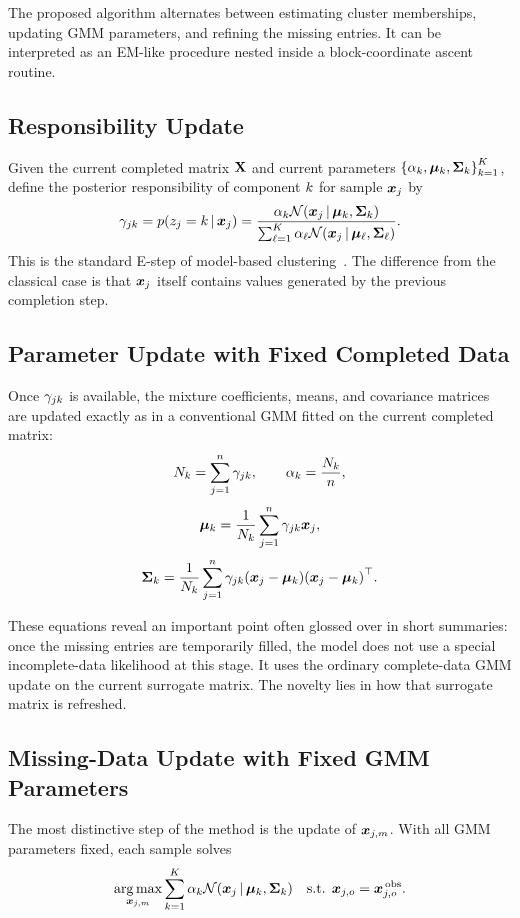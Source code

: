 The proposed algorithm alternates between estimating cluster memberships, updating GMM parameters, and refining the missing entries. It can be interpreted as an EM-like procedure nested inside a block-coordinate ascent routine.

\subsection{Responsibility Update}
Given the current completed matrix $\mat{X}$ and current parameters $\set*{\scal{\alpha}_k,\vect{\mu}_k,\mat{\Sigma}_k}_{k=1}^{\scal{K}}$, define the posterior responsibility of component $\scal{k}$ for sample $\vect{x}_j$ by
\[
    \scal{\gamma}_{jk}
    =
    p\paren*{\scal{z}_j = \scal{k} \given \vect{x}_j}
    =
    \frac{
        \scal{\alpha}_k \N\paren*{\vect{x}_j \given \vect{\mu}_k, \mat{\Sigma}_k}
    }{
        \sum_{\ell=1}^{\scal{K}}
        \scal{\alpha}_{\ell} \N\paren*{\vect{x}_j \given \vect{\mu}_{\ell}, \mat{\Sigma}_{\ell}}
    }.
\]
This is the standard E-step of model-based clustering~\cite{bouman1997cluster,melnykov2010finite}. The difference from the classical case is that $\vect{x}_j$ itself contains values generated by the previous completion step.

\subsection{Parameter Update with Fixed Completed Data}
Once $\scal{\gamma}_{jk}$ is available, the mixture coefficients, means, and covariance matrices are updated exactly as in a conventional GMM fitted on the current completed matrix:
\[
    \scal{N}_k = \sum_{j=1}^{\scal{n}} \scal{\gamma}_{jk},
    \qquad
    \scal{\alpha}_k = \frac{\scal{N}_k}{\scal{n}},
\]
\[
    \vect{\mu}_k
    =
    \frac{1}{\scal{N}_k}
    \sum_{j=1}^{\scal{n}}
    \scal{\gamma}_{jk}\vect{x}_j,
\]
\[
    \mat{\Sigma}_k
    =
    \frac{1}{\scal{N}_k}
    \sum_{j=1}^{\scal{n}}
    \scal{\gamma}_{jk}
    \paren*{\vect{x}_j - \vect{\mu}_k}
    \paren*{\vect{x}_j - \vect{\mu}_k}\trans.
\]

These equations reveal an important point often glossed over in short summaries: once the missing entries are temporarily filled, the model does not use a special incomplete-data likelihood at this stage. It uses the ordinary complete-data GMM update on the current surrogate matrix. The novelty lies in how that surrogate matrix is refreshed.

\subsection{Missing-Data Update with Fixed GMM Parameters}
The most distinctive step of the method is the update of $\vect{x}_{j,m}$. With all GMM parameters fixed, each sample solves
\[
    \argmax_{\vect{x}_{j,m}}
    \sum_{k=1}^{\scal{K}}
    \scal{\alpha}_k
    \N\paren*{\vect{x}_j \given \vect{\mu}_k, \mat{\Sigma}_k}
    \quad
    \text{s.t. }
    \vect{x}_{j,o} = \vect{x}^{\,\text{obs}}_{j,o}.
\]

